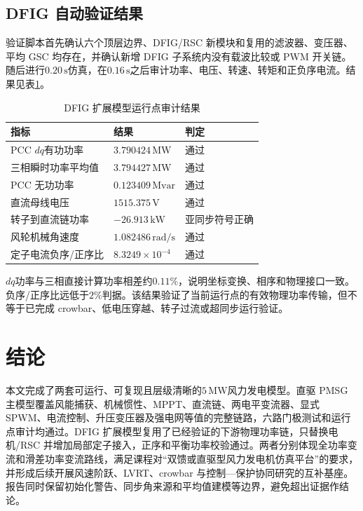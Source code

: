 \documentclass[UTF8,zihao=-4,fontset=none]{ctexrep}
\begin{document}
\section{DFIG 自动验证结果}
验证脚本首先确认六个顶层边界、DFIG/RSC 新模块和复用的滤波器、变压器、平均 GSC 均存在，并确认新增 DFIG 子系统内没有载波比较或 PWM 开关链。随后进行\(0.20\,\mathrm{s}\)仿真，在\(0.16\,\mathrm{s}\)之后审计功率、电压、转速、转矩和正负序电流。结果见表\ref{tab:dfigop}。

\begin{table}[H]
\centering
\caption{DFIG 扩展模型运行点审计结果}
\label{tab:dfigop}
\begin{tabular}{p{6.2cm}p{3.5cm}p{2.4cm}}
\toprule
指标 & 结果 & 判定\\
\midrule
PCC \(dq\)有功功率 & \(3.790424\,\mathrm{MW}\) & 通过\\
三相瞬时功率平均值 & \(3.794427\,\mathrm{MW}\) & 通过\\
PCC 无功功率 & \(0.123409\,\mathrm{Mvar}\) & 通过\\
直流母线电压 & \(1515.375\,\mathrm{V}\) & 通过\\
转子到直流链功率 & \(-26.913\,\mathrm{kW}\) & 亚同步符号正确\\
风轮机械角速度 & \(1.082486\,\mathrm{rad/s}\) & 通过\\
定子电流负序/正序比 & \(8.3249\times10^{-4}\) & 通过\\
\bottomrule
\end{tabular}
\end{table}

\(dq\)功率与三相直接计算功率相差约\(0.11\%\)，说明坐标变换、相序和物理接口一致。负序/正序比远低于\(2\%\)判据。该结果验证了当前运行点的有效物理功率传输，但不等于已完成 crowbar、低电压穿越、转子过流或超同步运行验证。

\chapter{结论}
本文完成了两套可运行、可复现且层级清晰的\(5\,\mathrm{MW}\)风力发电模型。直驱 PMSG 主模型覆盖风能捕获、机械惯性、MPPT、直流链、两电平变流器、显式 SPWM、电流控制、升压变压器及强电网等值的完整链路，六路门极测试和运行点审计均通过。DFIG 扩展模型复用了已经验证的下游物理功率链，只替换电机/RSC 并增加局部定子接入，正序和平衡功率校验通过。两者分别体现全功率变流和滑差功率变流路线，满足课程对“双馈或直驱型风力发电机仿真平台”的要求，并形成后续开展风速阶跃、LVRT、crowbar 与控制---保护协同研究的互补基座。报告同时保留初始化警告、同步角来源和平均值建模等边界，避免超出证据作结论。
\end{document}

